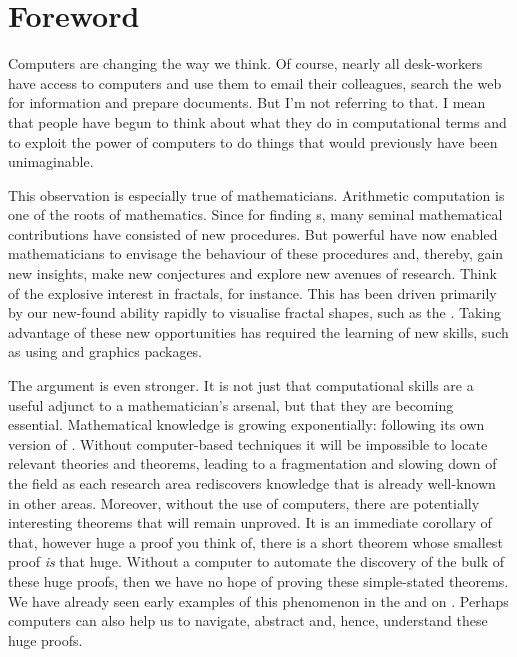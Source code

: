 
\section*{Foreword}

Computers are changing the way we think. Of course, nearly all desk-workers have access to
computers and use them to email their colleagues, search the web for information and
prepare documents.  But I'm not referring to that. I mean that people have begun to think
about what they do in computational terms and to exploit the power of computers to do
things that would previously have been unimaginable.

This observation is especially true of mathematicians. Arithmetic computation is one of
the roots of mathematics. Since {} for finding
{s}, many seminal mathematical contributions have
consisted of new procedures. But powerful {} have now enabled
mathematicians to envisage the behaviour of these procedures and, thereby, gain new
insights, make new conjectures and explore new avenues of research. Think of the explosive
interest in fractals, for instance.  This has been driven primarily by our new-found
ability rapidly to visualise fractal shapes, such as the {}.
Taking advantage of these new opportunities has required the learning of new skills, such
as using {} and graphics packages.

The argument is even stronger. It is not just that computational skills are a useful
adjunct to a mathematician's arsenal, but that they are becoming essential. Mathematical
knowledge is growing exponentially: following its own version of {}.
Without computer-based {} techniques it will be impossible
to locate relevant theories and theorems, leading to a fragmentation and slowing down of
the field as each research area rediscovers knowledge that is already well-known in other
areas. Moreover, without the use of computers, there are potentially interesting theorems
that will remain unproved. It is an immediate corollary of
{} that, however huge a proof you think of,
there is a short theorem whose smallest proof {\emph{is}} that huge.  Without a computer
to automate the discovery of the bulk of these huge proofs, then we have no hope of
proving these simple-stated theorems.  We have already seen early examples of this
phenomenon in the {} and {} on
{}.  Perhaps computers can also help us to navigate, abstract
and, hence, understand these huge proofs.

